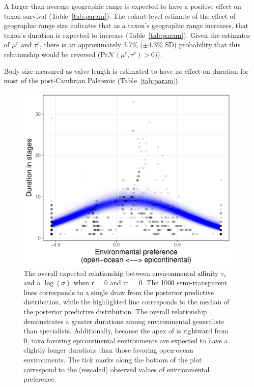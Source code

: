 \documentclass[11pt]{article}
\begin{document}
A larger than average geographic range is expected to have a positive effect on taxon survival (Table~\ref{tab:param}). The cohort-level estimate of the effect of geographic range size indicates that as a taxon's geographic range increases, that taxon's duration is expected to increase (Table~\ref{tab:param}). Given the estimates of \(\mu^{r}\) and \(\tau^{r}\), there is an approximately 3.7\% (\(\pm 4.3\%\) SD) probability that this relationship would be reversed (\(\mathrm{Pr}\mathcal{N}(\mu^{r}, \tau^{r}) > 0)\)). 

Body size measured as valve length is estimated to have no effect on duration for most of the post-Cambrian Paleozoic (Table~\ref{tab:param}).

\clearpage
\begin{figure}[ht]
  \centering
  \includegraphics[height = 0.5\textheight,width=\textwidth,keepaspectratio=true]{figure/env_effect_med_cweib_cens}
  \caption{The overall expected relationship between environmental affinity \(v_{i}\) and a \(\log(\sigma)\) when r = 0 and m = 0. The 1000 semi-transparent lines corresponds to a single draw from the posterior predictive distribution, while the highlighted line corresponds to the median of the posterior predictive distribution. The overall relationship demonstrates a greater durations among environmental generalists than specialists. Additionally, because the apex of is rightward from 0, taxa favoring epicontinental environments are expected to have a slightly longer durations than those favoring open-ocean environments. The tick marks along the bottom of the plot correspond to the (rescaled) observed values of environmental preference.}
  \label{fig:env_mean}
\end{figure}
\end{document}
